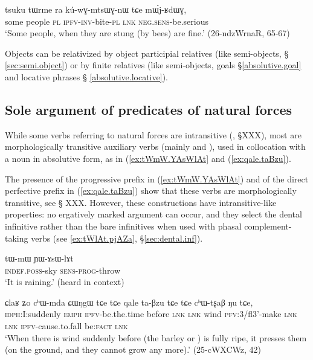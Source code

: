 \begin{exe}
\ex \label{ex:tsuku.tWrme.ra.kuwGmtsWGnW}
\gll tsuku tɯrme ra kú-wɣ-mtsɯɣ-nɯ tɕe mɯ́j-ʁdɯɣ, \\
some people \textsc{pl} \textsc{ipfv}-\textsc{inv}-bite-\textsc{pl} \textsc{lnk} \textsc{neg}.\textsc{sens}-be.serious \\
\glt `Some people, when they are stung (by bees) are fine.' (26-ndzWrnaR, 65-67)
\end{exe}

Objects can be relativized by object participial relatives (like semi-objects, § \ref{sec:semi.object}) or by finite relatives (like semi-objects, goals §\ref{absolutive.goal}  and locative phrases § \ref{absolutive.locative}).

\subsection{Sole argument of predicates of natural forces} \label{sec:absolutive.nature}
While some verbs referring to natural forces are intransitive (, §XXX), most are morphologically transitive auxiliary verbs (mainly  and ), used in collocation with a noun in absolutive form, as in (\ref{ex:tWmW.YAsWlAt} and (\ref{ex:qale.taBzu}).

The presence of the progressive  prefix in (\ref{ex:tWmW.YAsWlAt}) and of the direct perfective  prefix in (\ref{ex:qale.taBzu}) show that these verbs are morphologically transitive, see § XXX. However, these constructions have intransitive-like properties: no ergatively marked argument can occur, and they select the dental infinitive rather than the bare infinitives when used with phasal complement-taking verbs (see \ref{ex:tWlAt.pjAZa}, §\ref{sec:dental.inf}).

\begin{exe}
\ex \label{ex:tWmW.YAsWlAt}
 \gll tɯ-mɯ ɲɯ-ɤsɯ-lɤt \\
 \textsc{indef}.\textsc{poss}-sky \textsc{sens}-\textsc{prog}-throw \\
 \glt `It is raining.' (heard in context)
\end{exe}

\begin{exe}
\ex \label{ex:qale.taBzu}
 \gll ɕlaʁ ʑo cʰɯ-mda ɕɯŋgɯ tɕe tɕe qale ta-βzu tɕe tɕe cʰɯ-tʂaβ ŋu tɕe, \\
 \textsc{idph}:I:suddenly \textsc{emph} \textsc{ipfv}-be.the.time before  \textsc{lnk} \textsc{lnk} wind \textsc{pfv}:3/fl{}3'-make    \textsc{lnk} \textsc{lnk} \textsc{ipfv}-cause.to.fall be:\textsc{fact} \textsc{lnk} \\
 \glt `When there is wind suddenly before (the barley or ) is fully ripe, it presses them (on the ground, and they cannot grow any more).' (25-cWXCWz, 42)
\end{exe}

